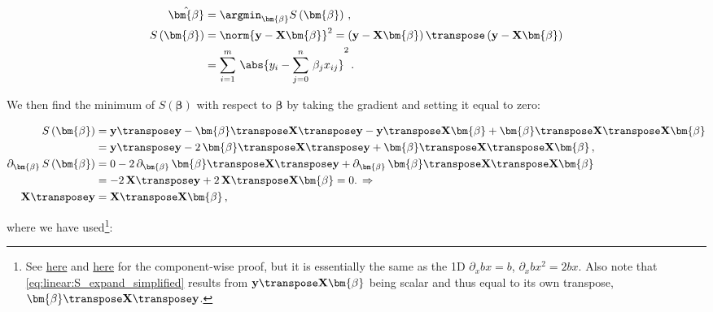 \begin{subequations} \label{eq:linear:ols}
\begin{align}
\hat{\bm{\beta}} &= \argmin_{\bm{\beta}} S\left(\bm{\beta}\right)\,, \label{eq:linear:argmin} \\
S\left(\bm{\beta}\right)
&= \norm{\mathbf{y} - \mathbf{X} \bm{\beta}}^{2} = \left(\mathbf{y} - \mathbf{X} \bm{\beta}\right)\transpose \left(\mathbf{y} - \mathbf{X} \bm{\beta}\right) \label{eq:linear:S_matrix} \\
&= \sum_{i=1}^{m} \, \abs{y_{i} - \sum_{j=0}^{n} \, \beta_{j} x_{ij}}^{2}\,. \label{eq:linear:S_components}
\end{align}
\end{subequations}

We then find the minimum of $S\left(\bm{\beta}\right)$ with respect to $\bm{\beta}$
by taking the gradient and setting it equal to zero:

\begin{subequations} \label{eq:linear:ols_derivation}
\begin{align}
S\left(\bm{\beta}\right) &=
 \mathbf{y}\transpose \mathbf{y}
-\bm{\beta}\transpose \mathbf{X}\transpose \mathbf{y}
-\mathbf{y}\transpose \mathbf{X} \bm{\beta}
+\bm{\beta}\transpose \mathbf{X}\transpose \mathbf{X} \bm{\beta} \label{eq:linear:S_expand} \\
&= \mathbf{y}\transpose \mathbf{y}
-2\, \bm{\beta}\transpose \mathbf{X}\transpose \mathbf{y}
+\bm{\beta}\transpose \mathbf{X}\transpose \mathbf{X} \bm{\beta}\,, \label{eq:linear:S_expand_simplified} \\
\partial_{\bm{\beta}} \, S\left(\bm{\beta}\right) &=
0
-2\, \partial_{\bm{\beta}} \, \bm{\beta}\transpose \mathbf{X}\transpose \mathbf{y}
+\partial_{\bm{\beta}} \, \bm{\beta}\transpose \mathbf{X}\transpose \mathbf{X} \bm{\beta} \label{eq:linear:grad_S_expand} \\
&= -2\, \mathbf{X}\transpose \mathbf{y} + 2\, \mathbf{X}\transpose \mathbf{X} \bm{\beta} = 0. \, \Rightarrow \label{eq:linear:grad_S} \\
\mathbf{X}\transpose \mathbf{y} &= \mathbf{X}\transpose \mathbf{X} \bm{\beta}\,, \label{eq:linear:penultimate}
\end{align}
\end{subequations}

\noindent where we have used\footnote{See \href{https://economictheoryblog.com/2015/02/19/ols_estimator/}{here}
and \href{https://economictheoryblog.com/2018/10/17/derivation-of-the-least-squares-estimator-for-beta-in-matrix-notation-proof-nr-1/}{here}
for the component-wise proof, but it is essentially the same as the 1D $\partial_{x} b x = b$, $\partial_{x} b x^{2} = 2 b x$.
Also note that \cref{eq:linear:S_expand_simplified} results from $\mathbf{y}\transpose \mathbf{X} \bm{\beta}$ being scalar
and thus equal to its own transpose, $\bm{\beta}\transpose \mathbf{X}\transpose \mathbf{y}$.}:


